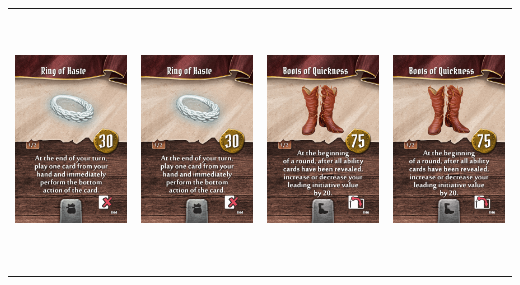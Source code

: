 \documentclass{minimal}
\begin{document}
{\begin{longtable}{llll}
\includegraphics[width=44mm,height=68mm]{./36-42/gh-042-ring-of-haste.png} &
\includegraphics[width=44mm,height=68mm]{./36-42/gh-042-ring-of-haste.png} &
\includegraphics[width=44mm,height=68mm]{./43-49/gh-043-boots-of-quickness.png} &
\includegraphics[width=44mm,height=68mm]{./43-49/gh-043-boots-of-quickness.png}\\ 

\end{longtable}}
\end{document}
